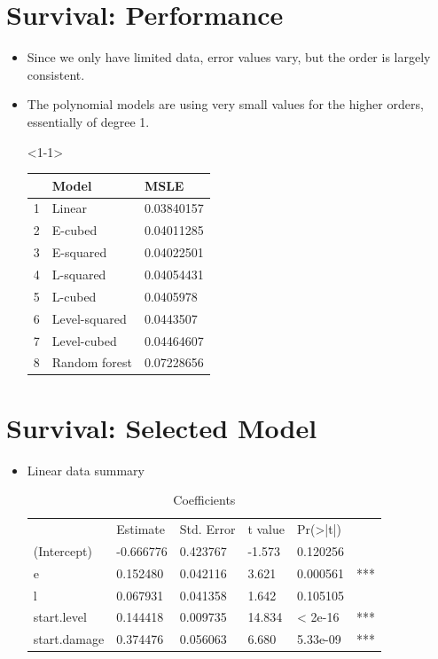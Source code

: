 \documentclass{beamer}
\begin{document}
\section{Survival: Performance}
\begin{frame}
  \begin{itemize}
  \item Since we only have limited data, error values vary, but the order is largely consistent.
    \item<2-> The polynomial models are using very small values for the higher orders, essentially of degree 1.
	\item[]<1-1>
    \begin{table}
      \begin{tabular}{l|ll}
        &\textbf{Model}&\textbf{MSLE}\\\hline
        1 & Linear & 0.03840157 \\
        2 & E-cubed & 0.04011285 \\
        3 & E-squared & 0.04022501 \\
        4 & L-squared & 0.04054431 \\
        5 & L-cubed & 0.0405978 \\
        6 & Level-squared & 0.0443507 \\
        7 & Level-cubed & 0.04464607 \\
        8 & Random forest & 0.07228656 \\
      \end{tabular}
  \end{table}
\end{itemize}
\end{frame}

\section{Survival: Selected Model}
\begin{frame}
  \begin{itemize}
  \item Linear data summary
    \begin{table}
      \centering
      \caption{Coefficients}
      \begin{tabular}{l|lllll}
        &Estimate& Std. Error& t value& Pr(>|t|)    \\
        (Intercept)  &-0.666776&   0.423767&  -1.573& 0.120256&    \\
        e            & 0.152480&   0.042116&   3.621& 0.000561& ***\\
        l            & 0.067931&   0.041358&   1.642& 0.105105&    \\
        start.level  & 0.144418&   0.009735&  14.834&  < 2e-16& ***\\
        start.damage & 0.374476&   0.056063&   6.680& 5.33e-09& ***\\
      \end{tabular}
    \end{table}
  \end{itemize}
\end{frame}
\end{document}
